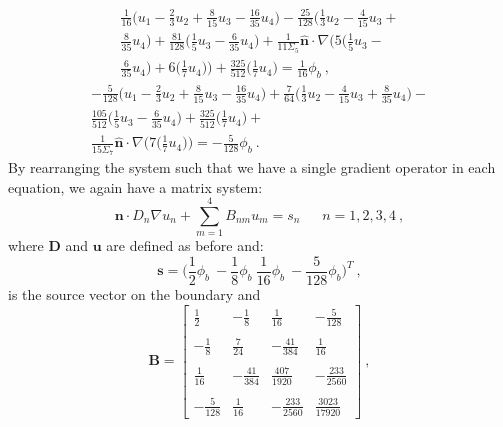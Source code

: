 \begin{multline}
    \frac{1}{16}\Big(u_1 - \frac{2}{3}u_2 + \frac{8}{15}u_3 -
    \frac{16}{35}u_4\Big) - \frac{25}{128}\Big(\frac{1}{3}u_2 -
    \frac{4}{15}u_3 +\\ \frac{8}{35}u_4\Big) +
    \frac{81}{128}\Big(\frac{1}{5}u_3 - \frac{6}{35}u_4\Big) +
    \frac{1}{11\Sigma_5}\hat{\mathbf{n}}\cdot\nabla\Big(5\Big(\frac{1}{5}u_3
    -\\ \frac{6}{35}u_4\Big) + 6\Big(\frac{1}{7}u_4\Big)\Big) +
    \frac{325}{512}\Big(\frac{1}{7}u_4\Big) = \frac{1}{16}\phi_{b}\:,
\end{multline}
\begin{multline}
    -\frac{5}{128}\Big(u_1 - \frac{2}{3}u_2 + \frac{8}{15}u_3 -
    \frac{16}{35}u_4\Big) + \frac{7}{64}\Big(\frac{1}{3}u_2 -
    \frac{4}{15}u_3 + \frac{8}{35}u_4\Big)
    -\\ \frac{105}{512}\Big(\frac{1}{5}u_3 - \frac{6}{35}u_4\Big) +
    \frac{325}{512}\Big(\frac{1}{7}u_4\Big)
    +\\ \frac{1}{15\Sigma_7}\hat{\mathbf{n}}
    \cdot\nabla\Big(7\Big(\frac{1}{7}u_4\Big)\Big) =
    -\frac{5}{128}\phi_{b}\:.
\end{multline}
By rearranging the system such that we have a single gradient operator
in each equation, we again have a matrix system:
\begin{equation}
  \mathbf{n} \cdot D_n \nabla u_n + \sum_{m=1}^4 B_{nm} u_m =
  s_n\ \ \ \ \ \ \ n = 1,2,3,4\:,
  \label{eq:spn_bnd_matrix}
\end{equation}
where $\mathbf{D}$ and $\mathbf{u}$ are defined as before and:
\begin{equation}
  \mathbf{s} = \Big(\frac{1}{2}\phi_b\ -\frac{1}{8}\phi_b\
  \frac{1}{16}\phi_b\ -\frac{5}{128}\phi_b \Big)^T\:,
  \label{eq:spn_bnd_source}
\end{equation}
is the source vector on the boundary and
\begin{equation}
  \mathbf{B} = \begin{bmatrix}
    \frac{1}{2} &
    -\frac{1}{8} &
    \frac{1}{16} &
    -\frac{5}{128} \\
    &&&\\
    -\frac{1}{8} &
    \frac{7}{24} &
    -\frac{41}{384} &
    \frac{1}{16} \\
    &&&\\
    \frac{1}{16} &
    -\frac{41}{384} &
    \frac{407}{1920} &
    -\frac{233}{2560} \\
    &&&\\
    -\frac{5}{128} &
    \frac{1}{16} &
    -\frac{233}{2560} &
    \frac{3023}{17920}
  \end{bmatrix}\:,
  \label{eq:B_matrix}
\end{equation}
